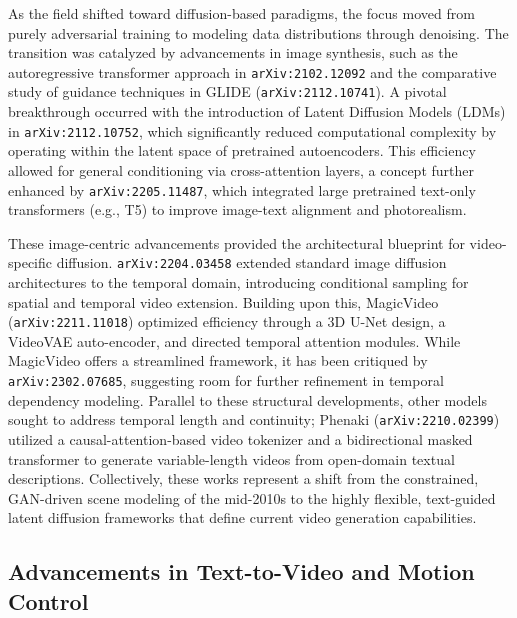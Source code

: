 \documentclass[11pt]{article}
\begin{document}
As the field shifted toward diffusion-based paradigms, the focus moved from purely adversarial training to modeling data distributions through denoising. The transition was catalyzed by advancements in image synthesis, such as the autoregressive transformer approach in \texttt{arXiv:2102.12092} and the comparative study of guidance techniques in GLIDE (\texttt{arXiv:2112.10741}). A pivotal breakthrough occurred with the introduction of Latent Diffusion Models (LDMs) in \texttt{arXiv:2112.10752}, which significantly reduced computational complexity by operating within the latent space of pretrained autoencoders. This efficiency allowed for general conditioning via cross-attention layers, a concept further enhanced by \texttt{arXiv:2205.11487}, which integrated large pretrained text-only transformers (e.g., T5) to improve image-text alignment and photorealism.

These image-centric advancements provided the architectural blueprint for video-specific diffusion. \texttt{arXiv:2204.03458} extended standard image diffusion architectures to the temporal domain, introducing conditional sampling for spatial and temporal video extension. Building upon this, MagicVideo (\texttt{arXiv:2211.11018}) optimized efficiency through a 3D U-Net design, a VideoVAE auto-encoder, and directed temporal attention modules. While MagicVideo offers a streamlined framework, it has been critiqued by \texttt{arXiv:2302.07685}, suggesting room for further refinement in temporal dependency modeling. Parallel to these structural developments, other models sought to address temporal length and continuity; Phenaki (\texttt{arXiv:2210.02399}) utilized a causal-attention-based video tokenizer and a bidirectional masked transformer to generate variable-length videos from open-domain textual descriptions. Collectively, these works represent a shift from the constrained, GAN-driven scene modeling of the mid-2010s to the highly flexible, text-guided latent diffusion frameworks that define current video generation capabilities.

\subsection{Advancements in Text-to-Video and Motion Control}
\end{document}
